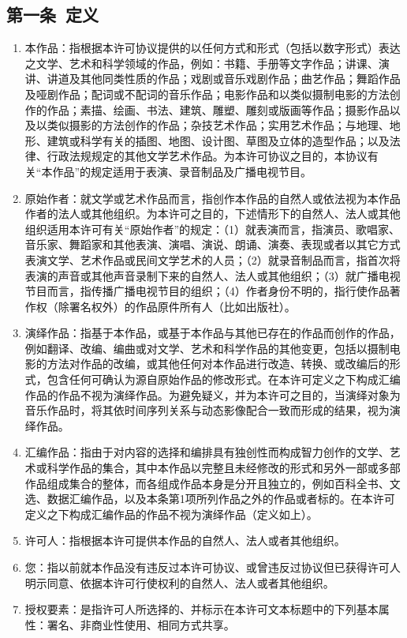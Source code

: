 \subsection{第一条\ 定义} 
\begin{enumerate}
	\item 本作品：指根据本许可协议提供的以任何方式和形式（包括以数字形式）表达之文学、艺术和科学领域的作品，例如：书籍、手册等文字作品；讲课、演讲、讲道及其他同类性质的作品；戏剧或音乐戏剧作品；曲艺作品；舞蹈作品及哑剧作品；配词或不配词的音乐作品；电影作品和以类似摄制电影的方法创作的作品；素描、绘画、书法、建筑、雕塑、雕刻或版画等作品；摄影作品以及以类似摄影的方法创作的作品；杂技艺术作品；实用艺术作品；与地理、地形、建筑或科学有关的插图、地图、设计图、草图及立体的造型作品；以及法律、行政法规规定的其他文学艺术作品。为本许可协议之目的，本协议有关“本作品”的规定适用于表演、录音制品及广播电视节目。 
	\item 原始作者：就文学或艺术作品而言，指创作本作品的自然人或依法视为本作品作者的法人或其他组织。为本许可之目的，下述情形下的自然人、法人或其他组织适用本许可有关“原始作者”的规定：（1）就表演而言，指演员、歌唱家、音乐家、舞蹈家和其他表演、演唱、演说、朗诵、演奏、表现或者以其它方式表演文学、艺术作品或民间文学艺术的人员；（2）就录音制品而言，指首次将表演的声音或其他声音录制下来的自然人、法人或其他组织；（3）就广播电视节目而言，指传播广播电视节目的组织；（4）作者身份不明的，指行使作品著作权（除署名权外）的作品原件所有人（比如出版社）。
	\item 演绎作品：指基于本作品，或基于本作品与其他已存在的作品而创作的作品，例如翻译、改编、编曲或对文学、艺术和科学作品的其他变更，包括以摄制电影的方法对作品的改编，或其他任何对本作品进行改造、转换、或改编后的形式，包含任何可确认为源自原始作品的修改形式。在本许可定义之下构成汇编作品的作品不视为演绎作品。为避免疑义，并为本许可之目的，当演绎对象为音乐作品时，将其依时间序列关系与动态影像配合一致而形成的结果，视为演绎作品。
	\item 汇编作品：指由于对内容的选择和编排具有独创性而构成智力创作的文学、艺术或科学作品的集合，其中本作品以完整且未经修改的形式和另外一部或多部作品组成集合的整体，而各组成作品本身是分开且独立的，例如百科全书、文选、数据汇编作品，以及本条第1项所列作品之外的作品或者标的。在本许可定义之下构成汇编作品的作品不视为演绎作品（定义如上）。
	\item 许可人：指根据本许可提供本作品的自然人、法人或者其他组织。
	\item 您：指以前就本作品没有违反过本许可协议、或曾违反过协议但已获得许可人明示同意、依据本许可行使权利的自然人、法人或者其他组织。
	\item 授权要素：是指许可人所选择的、并标示在本许可文本标题中的下列基本属性：署名、非商业性使用、相同方式共享。

\end{enumerate}
